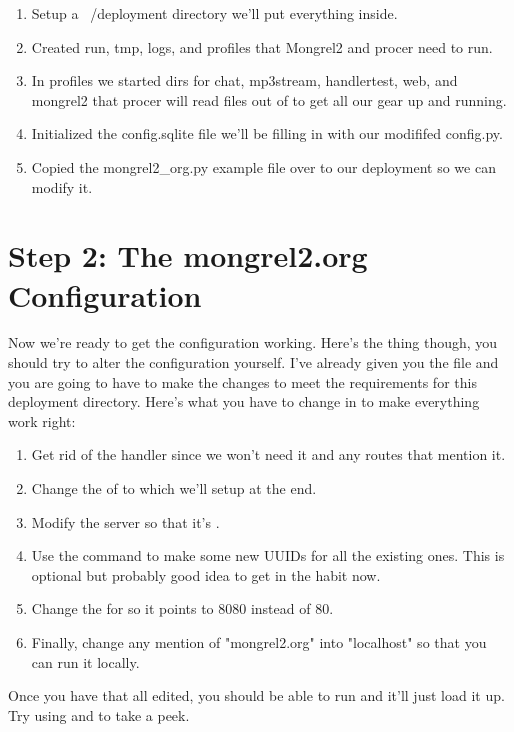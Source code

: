 \begin{enumerate}
\item Setup a ~/deployment directory we'll put everything inside.
\item Created run, tmp, logs, and profiles that Mongrel2 and procer need to run.
\item In profiles we started dirs for chat, mp3stream, handlertest, web, and mongrel2
    that procer will read files out of to get all our gear up and running.
\item Initialized the config.sqlite file we'll be filling in with our modififed config.py.
\item Copied the mongrel2\_org.py example file over to our deployment so we can modify it.
\end{enumerate}


\section{Step 2: The mongrel2.org Configuration}

Now we're ready to get the configuration working.  Here's the thing though, you should 
try to alter the configuration yourself.  I've already given you the file and you are
going to have to make the changes to meet the requirements for this deployment directory.
Here's what you have to change in  to make everything work right:

\begin{enumerate}
\item Get rid of the  handler since we won't need it and
    any routes that mention it.
\item Change the  of  to  which we'll setup at the end.
\item Modify the server  so that it's .
\item Use the  command to make some new UUIDs for all the 
    existing ones.  This is optional but probably good idea to get in the 
    habit now.
\item Change the  for  so it points to 8080 instead of 80.
\item Finally, change any mention of "mongrel2.org" into "localhost" so that you
    can run it locally.
\end{enumerate}

Once you have that all edited, you should be able to run  and it'll just load it up.  Try using
 and  to take a peek.


